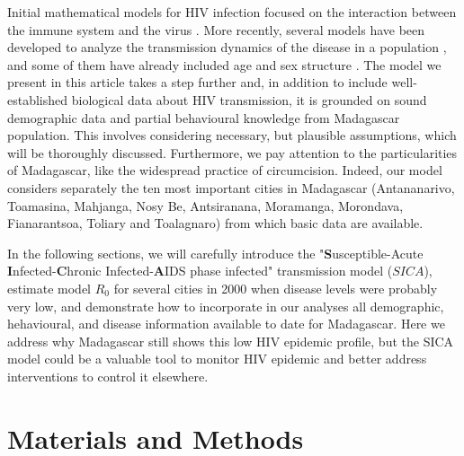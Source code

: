 \documentclass[preprint,12pt]{elsarticle}
\begin{document}
Initial mathematical models for HIV infection focused on the interaction between the immune system and the virus \cite{Nowak01,Keeling08}. More recently, several models have been developed to analyze the transmission dynamics of the disease in a population \cite{Mukandarive2007,MUKANDAVIRE2009,Kim2014,Aldila2018,Omondi2018,Omondi2019}, and some of them have already included age and sex structure \cite{Mukandarive2007,Omondi2018,Omondi2019}. The model we present in this article takes a step further and, in addition to include well-established biological data about HIV transmission, it is grounded on sound demographic data and partial behavioural knowledge from Madagascar population. This involves considering necessary, but plausible assumptions, which will be thoroughly discussed.  Furthermore, we pay attention to the particularities of Madagascar, like the widespread practice of circumcision. Indeed, our model considers separately the ten most important cities in Madagascar (Antananarivo, Toamasina, Mahjanga, Nosy Be, Antsiranana, Moramanga, Morondava, Fianarantsoa, Toliary and Toalagnaro) from which basic data are available. 
 \smallskip

 In the following sections, we will carefully introduce the "{\bf S}usceptible-Acute {\bf I}nfected-{\bf C}hronic Infected-{\bf A}IDS phase infected" transmission model ({\bf $SICA$}), estimate model $R_0$ for several cities in 2000 when disease levels were probably very low, and demonstrate how to incorporate in our analyses all demographic, hehavioural, and disease information available to date for Madagascar. Here we address why Madagascar still shows this low HIV epidemic profile, but the SICA model could be a valuable tool to monitor HIV epidemic and better address interventions to control it elsewhere. 

\section{Materials and Methods}
\end{document}
